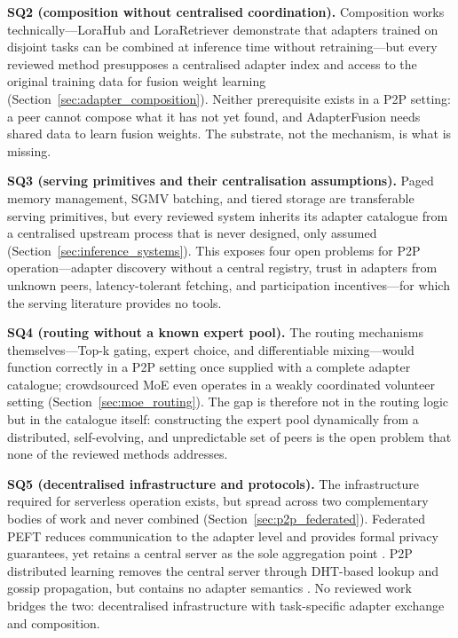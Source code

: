 \noindent\textbf{SQ2 (composition without centralised coordination).}
Composition works technically---LoraHub and LoraRetriever
demonstrate that adapters trained on disjoint tasks can be combined at
inference time without retraining---but every reviewed method presupposes a
centralised adapter index and access to the original training data for fusion
weight learning (Section~\ref{sec:adapter_composition}). Neither prerequisite
exists in a P2P setting: a peer cannot compose what it has not yet found, and
AdapterFusion \cite{Pfeiffer2021fusion} needs shared data to learn fusion
weights. The substrate, not the mechanism, is what is missing.

\noindent\textbf{SQ3 (serving primitives and their centralisation
assumptions).} Paged memory management, SGMV batching, and tiered storage are
transferable serving primitives, but every reviewed system inherits its
adapter catalogue from a centralised upstream process that is never designed,
only assumed (Section~\ref{sec:inference_systems}). This exposes four open
problems for P2P operation---adapter discovery without a central registry,
trust in adapters from unknown peers, latency-tolerant fetching, and
participation incentives---for which the serving literature provides no tools.

\noindent\textbf{SQ4 (routing without a known expert pool).} The routing
mechanisms themselves---Top-k gating, expert choice, and differentiable
mixing---would function correctly in a P2P setting once supplied with a
complete adapter catalogue; crowdsourced MoE even operates in a weakly
coordinated volunteer setting \cite{RyabininCrowdsourced2020}
(Section~\ref{sec:moe_routing}). The gap is therefore not in the routing logic
but in the catalogue itself: constructing the expert pool dynamically from a
distributed, self-evolving, and unpredictable set of peers is the open problem
that none of the reviewed methods addresses.

\noindent\textbf{SQ5 (decentralised infrastructure and protocols).} The
infrastructure required for serverless operation exists, but spread across two
complementary bodies of work and never combined (Section~\ref{sec:p2p_federated}).
Federated PEFT reduces communication to the adapter level and provides formal
privacy guarantees, yet retains a central server as the sole aggregation point
\cite{McMahan2017, ZhangFedPETuning2023}. P2P distributed learning removes the
central server through DHT-based lookup and gossip propagation, but contains no
adapter semantics \cite{MaymounkovKademlia2002, OrmandyGossip2013}. No reviewed
work bridges the two: decentralised infrastructure with task-specific adapter
exchange and composition.

